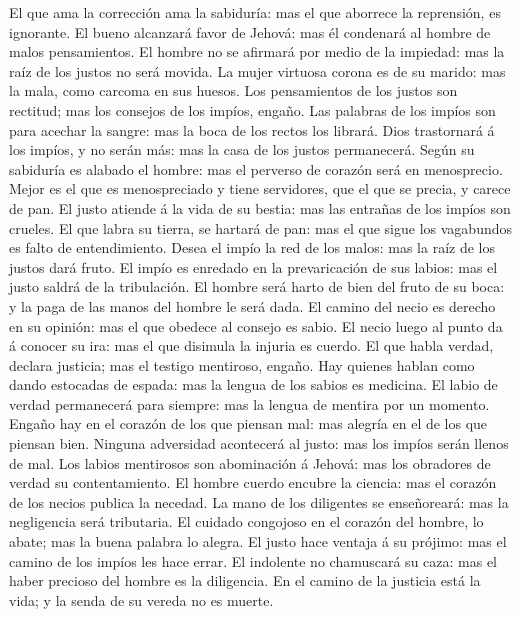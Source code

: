  El que ama la corrección ama la sabiduría: mas el que
aborrece la reprensión, es ignorante.  El bueno alcanzará
favor de Jehová: mas él condenará al hombre de malos pensamientos.
 El hombre no se afirmará por medio de la impiedad: mas la
raíz de los justos no será movida.  La mujer virtuosa
corona es de su marido: mas la mala, como carcoma en sus huesos.
 Los pensamientos de los justos son rectitud; mas los
consejos de los impíos, engaño.  Las palabras de los
impíos son para acechar la sangre: mas la boca de los rectos los
librará.  Dios trastornará á los impíos, y no serán más:
mas la casa de los justos permanecerá.  Según su sabiduría
es alabado el hombre: mas el perverso de corazón será en menosprecio.
 Mejor es el que es menospreciado y tiene servidores, que
el que se precia, y carece de pan.  El justo atiende á la
vida de su bestia: mas las entrañas de los impíos son crueles.
 El que labra su tierra, se hartará de pan: mas el que
sigue los vagabundos es falto de entendimiento.  Desea el
impío la red de los malos: mas la raíz de los justos dará fruto.
 El impío es enredado en la prevaricación de sus labios:
mas el justo saldrá de la tribulación.  El hombre será
harto de bien del fruto de su boca: y la paga de las manos del hombre le
será dada.  El camino del necio es derecho en su opinión:
mas el que obedece al consejo es sabio.  El necio luego
al punto da á conocer su ira: mas el que disimula la injuria es cuerdo.
 El que habla verdad, declara justicia; mas el testigo
mentiroso, engaño.  Hay quienes hablan como dando
estocadas de espada: mas la lengua de los sabios es medicina.
 El labio de verdad permanecerá para siempre: mas la
lengua de mentira por un momento.  Engaño hay en el
corazón de los que piensan mal: mas alegría en el de los que piensan
bien.  Ninguna adversidad acontecerá al justo: mas los
impíos serán llenos de mal.  Los labios mentirosos son
abominación á Jehová: mas los obradores de verdad su contentamiento.
 El hombre cuerdo encubre la ciencia: mas el corazón de
los necios publica la necedad.  La mano de los diligentes
se enseñoreará: mas la negligencia será tributaria.  El
cuidado congojoso en el corazón del hombre, lo abate; mas la buena
palabra lo alegra.  El justo hace ventaja á su prójimo:
mas el camino de los impíos les hace errar.  El indolente
no chamuscará su caza: mas el haber precioso del hombre es la
diligencia.  En el camino de la justicia está la vida; y
la senda de su vereda no es muerte.


